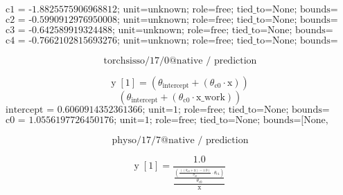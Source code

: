\[\text{c1 = -1.8825575906968812; unit=unknown; role=free; tied\_to=None; bounds=[None, None]; origin=native\_coefficient\_block}\]
\[\text{c2 = -0.5990912976950008; unit=unknown; role=free; tied\_to=None; bounds=[None, None]; origin=native\_coefficient\_block}\]
\[\text{c3 = -0.642589919324488; unit=unknown; role=free; tied\_to=None; bounds=[None, None]; origin=native\_normalized\_denominator\_coordinate}\]
\[\text{c4 = -0.7662102815693276; unit=unknown; role=free; tied\_to=None; bounds=[None, None]; origin=native\_normalized\_denominator\_coordinate}\]
\noindent {}\par
\noindent {}\par
\noindent {}\par
\noindent {}\par
\[\text{torchsisso/17/0@native / prediction}\]
\noindent {}\par
\[\text{y}\;[\text{1}] = \left(\theta_{\text{intercept}} + \left(\theta_{\text{c0}} \cdot \text{x}\right)\right)\]
\[\left(\theta_{\text{intercept}} + \left(\theta_{\text{c0}} \cdot \text{x\_work}\right)\right)\]
\[\text{intercept = 0.6060914352361366; unit=1; role=free; tied\_to=None; bounds=[None, None]; origin=native\_regression\_solve}\]
\[\text{c0 = 1.0556197726450176; unit=1; role=free; tied\_to=None; bounds=[None, None]; origin=native\_regression\_solve}\]
\noindent {}\par
\noindent {}\par
\noindent {}\par
\noindent {}\par
\[\text{physo/17/7@native / prediction}\]
\noindent {}\par
\[\text{y}\;[\text{1}] = \frac{1.0}{\frac{\frac{\left(\frac{\left(\left(\theta_{\text{c0}} + \text{x}\right) - 1.0\right)}{\theta_{\text{c0}}} \cdot \theta_{\text{c1}}\right)}{\theta_{\text{c0}}}}{\text{x}}}\]
